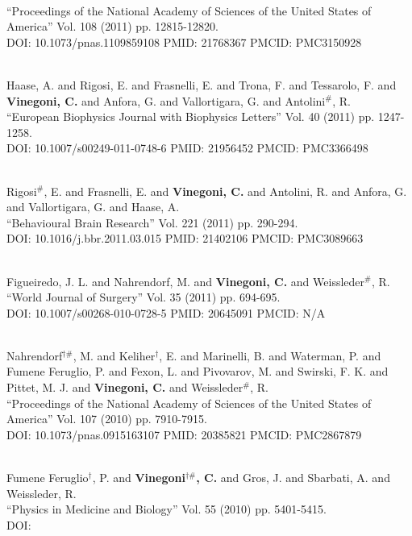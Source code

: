 \\ ``Proceedings of the National Academy of Sciences of the United States of America'' Vol. 108 (2011) pp. 12815-12820. \\ DOI: 10.1073/pnas.1109859108 PMID: 21768367 PMCID: PMC3150928\item {} \\ Haase, A. and Rigosi, E. and Frasnelli, E. and Trona, F. and Tessarolo, F. and {\bf Vinegoni, C.} and Anfora, G. and Vallortigara, G. and Antolini$^\#$, R. \\ ``European Biophysics Journal with Biophysics Letters'' Vol. 40 (2011) pp. 1247-1258. \\ DOI: 10.1007/s00249-011-0748-6 PMID: 21956452 PMCID: PMC3366498\item {} \\ Rigosi$^\#$, E. and Frasnelli, E. and {\bf Vinegoni, C.} and Antolini, R. and Anfora, G. and Vallortigara, G. and Haase, A. \\ ``Behavioural Brain Research'' Vol. 221 (2011) pp. 290-294. \\ DOI: 10.1016/j.bbr.2011.03.015 PMID: 21402106 PMCID: PMC3089663\item {} \\ Figueiredo, J. L. and Nahrendorf, M. and {\bf Vinegoni, C.} and Weissleder$^\#$, R. \\ ``World Journal of Surgery'' Vol. 35 (2011) pp. 694-695. \\ DOI: 10.1007/s00268-010-0728-5 PMID: 20645091 PMCID: N/A\item {} \\ Nahrendorf$^{\dag \#}$, M. and Keliher$^\dag$, E. and Marinelli, B. and Waterman, P. and Fumene Feruglio, P. and Fexon, L. and Pivovarov, M. and Swirski, F. K. and Pittet, M. J. and {\bf Vinegoni, C.} and Weissleder$^\#$, R. \\ ``Proceedings of the National Academy of Sciences of the United States of America'' Vol. 107 (2010) pp. 7910-7915. \\ DOI: 10.1073/pnas.0915163107 PMID: 20385821 PMCID: PMC2867879\item {} \\ Fumene Feruglio$^\dag$, P. and {\bf Vinegoni$^{\dag \#}$, C.} and Gros, J. and Sbarbati, A. and Weissleder, R. \\ ``Physics in Medicine and Biology'' Vol. 55 (2010) pp. 5401-5415. \\ DOI: 